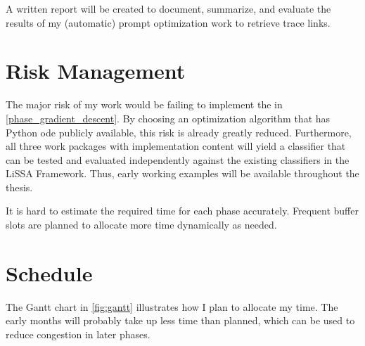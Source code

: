 A written report will be created to document, summarize, and evaluate the results of my (automatic) prompt optimization work to retrieve trace links.


\section{Risk Management}
\label{sec:work_risks}
The major risk of my work would be failing to implement the  in \autoref{phase_gradient_descent}. By choosing an optimization algorithm that has Python ode publicly available, this risk is already greatly reduced. Furthermore, all three work packages with implementation content will yield a classifier that can be tested and evaluated independently against the existing classifiers in the LiSSA Framework. Thus, early working examples will be available throughout the thesis. 

It is hard to estimate the required time for each phase accurately. Frequent buffer slots are planned to allocate more time dynamically as needed.




\section{Schedule}
\label{sec:work_gant}
The Gantt chart in \autoref{fig:gantt} illustrates how I plan to allocate my time. The early months will probably take up less time than planned, which can be used to reduce congestion in later phases.


